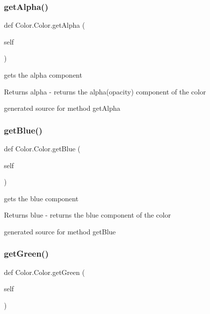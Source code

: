 \subsubsection{\texorpdfstring{get\+Alpha()}{getAlpha()}}
{\footnotesize\ttfamily def Color.\+Color.\+get\+Alpha (\begin{DoxyParamCaption}\item[{}]{self }\end{DoxyParamCaption})}



gets the alpha component 

\begin{DoxyReturn}{Returns}
alpha -\/ returns the alpha(opacity) component of the color\begin{DoxyVerb}generated source for method getAlpha \end{DoxyVerb}
 
\end{DoxyReturn}
\hypertarget{class_color_1_1_color_a00ee33a98b9243f68dd02d4882698ff6}{}\label{class_color_1_1_color_a00ee33a98b9243f68dd02d4882698ff6} 
\subsubsection{\texorpdfstring{get\+Blue()}{getBlue()}}
{\footnotesize\ttfamily def Color.\+Color.\+get\+Blue (\begin{DoxyParamCaption}\item[{}]{self }\end{DoxyParamCaption})}



gets the blue component 

\begin{DoxyReturn}{Returns}
blue -\/ returns the blue component of the color\begin{DoxyVerb}generated source for method getBlue \end{DoxyVerb}
 
\end{DoxyReturn}
\hypertarget{class_color_1_1_color_acf5013ef6e09f0d3a86b6f4044e60abb}{}\label{class_color_1_1_color_acf5013ef6e09f0d3a86b6f4044e60abb} 
\subsubsection{\texorpdfstring{get\+Green()}{getGreen()}}
{\footnotesize\ttfamily def Color.\+Color.\+get\+Green (\begin{DoxyParamCaption}\item[{}]{self }\end{DoxyParamCaption})}



